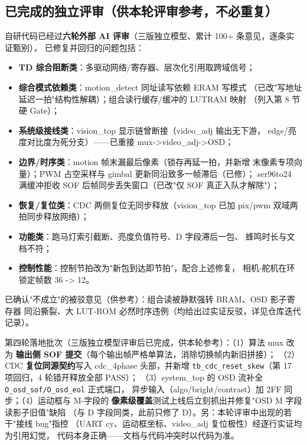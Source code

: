 \documentclass[10pt]{ctexart}
\newcommand{\code}[1]{\texttt{#1}}
\begin{document}
\subsection{已完成的独立评审（供本轮评审参考，不必重复）}

自研代码已经过\textbf{六轮外部 AI 评审}（三版独立模型、累计 100+ 条意见，逐条实证甄别），
已修复并回归的问题包括：

\begin{itemize}
  \item \textbf{TD 综合阻断类}：多驱动网络/寄存器、层次化引用取跨域信号；
  \item \textbf{综合模式依赖类}：motion\_detect 同址读写依赖 ERAM 写模式
        （已改"写地址延迟一拍"结构性解耦）；组合读行缓存/缓冲的 LUTRAM 映射
        （列入第 8 节硬 Gate）；
  \item \textbf{系统级接线类}：vision\_top 显示链曾断接（video\_adj 输出无下游，
        edge/亮度对比度为死分支）——已重接 mux->video\_adj->OSD；
  \item \textbf{边界/时序类}：motion 帧末漏最后像素（锁存再延一拍，并新增
        末像素专项向量）；PWM 占空采样与 gimbal 更新同沿致多一帧滞后（已修）；
        ser96to24 满缓冲拒收 SOF 后帧同步丢失窗口（已改"仅 SOF 真正入队才解除"）；
  \item \textbf{恢复/复位类}：CDC 两侧复位无同步释放（vision\_top 已加 pix/pwm
        双域两拍同步释放网络）；
  \item \textbf{功能类}：跑马灯索引截断、亮度负值符号、D 字段滞后一包、
        蜂鸣时长与文档不符；
  \item \textbf{控制性能}：控制节拍改为"新包到达即节拍"，配合上述修复，
        相机-舵机在环锁定帧数 36 -> 12。
\end{itemize}

已确认"不成立"的被驳意见（供参考）：组合读被静默强转 BRAM、OSD 影子寄存器
同沿撕裂、大 LUT-ROM 必然时序违例（均给出过实证反驳，详见仓库迭代记录）。

第四轮落地批次（三版独立模型评审后已完成，供本轮参考）：（1）算法 mux 改为
\textbf{输出侧 SOF 提交}（每个输出帧严格单算法，消除切换帧内新旧拼接）；
（2）CDC \textbf{复位同源契约}写入 cdc\_4phase 头部，并新增
\code{tb\_cdc\_reset\_skew}（第 17 项回归，4 轮错开释放全部 PASS）；
（3）system\_top 的 OSD 流补全 \code{O\_osd\_sof/O\_osd\_eol} 正式端口，
异步输入（algo/bright/contrast）加 2FF 同步；（4）运动框与 M-字段的
\textbf{像素级覆盖}测试上线后立刻抓出并修复"OSD M 字段读影子旧值"缺陷
（与 D 字段同类，此前只修了 D）。另：本轮评审中出现的若干"接线 bug"指控
（UART cy、运动框坐标、video\_adj 复位极性）经逐行实证均为引用幻觉，
代码本身正确——文档与代码冲突时以代码为准。
\end{document}
